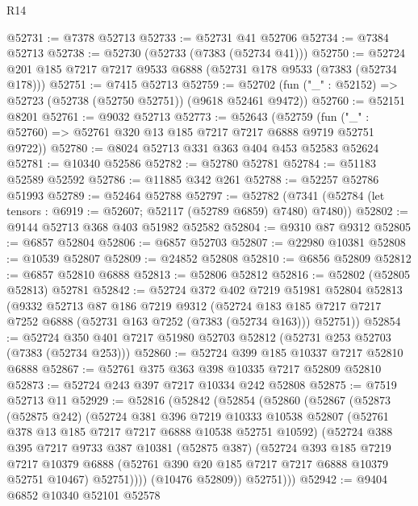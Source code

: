 \begin{lexlean}{R14}
\begin{coremodule}
@52731 := @7378 @52713
@52733 := @52731 @41 @52706
@52734 := @7384 @52713
@52738 := @52730 (@52733 (@7383 (@52734 @41)))
@52750 := @52724 @201 @185 @7217 @7217 @9533 @6888 (@52731 @178 @9533 (@7383 (@52734 @178)))
@52751 := @7415 @52713
@52759 := @52702 (fun ("_" : @52152) => @52723 (@52738 (@52750 @52751)) (@9618 @52461 @9472))
@52760 := @52151 @8201
@52761 := @9032 @52713
@52773 := @52643
    (@52759 (fun ("_" : @52760) => @52761 @320 @13 @185 @7217 @7217 @6888 @9719 @52751 @9722))
@52780 := @8024 @52713 @331 @363 @404 @453 @52583 @52624
@52781 := @10340 @52586
@52782 := @52780 @52781
@52784 := @51183 @52589 @52592
@52786 := @11885 @342 @261
@52788 := @52257 @52786 @51993
@52789 := @52464 @52788
@52797 := @52782 (@7341 (@52784 (let tensors : @6919 := @52607; @52117 (@52789 @6859) @7480) @7480))
@52802 := @9144 @52713 @368 @403 @51982 @52582
@52804 := @9310 @87 @9312
@52805 := @6857 @52804
@52806 := @6857 @52703
@52807 := @22980 @10381
@52808 := @10539 @52807
@52809 := @24852 @52808
@52810 := @6856 @52809
@52812 := @6857 @52810 @6888
@52813 := @52806 @52812
@52816 := @52802 (@52805 @52813) @52781
@52842 := @52724
    @372
    @402
    @7219
    @51981
    @52804
    @52813
    (@9332
      @52713
      @87
      @186
      @7219
      @9312
      (@52724 @183 @185 @7217 @7217 @7252 @6888 (@52731 @163 @7252 (@7383 (@52734 @163))) @52751))
@52854 := @52724 @350 @401 @7217 @51980 @52703 @52812 (@52731 @253 @52703 (@7383 (@52734 @253)))
@52860 := @52724 @399 @185 @10337 @7217 @52810 @6888
@52867 := @52761 @375 @363 @398 @10335 @7217 @52809 @52810
@52873 := @52724 @243 @397 @7217 @10334 @242 @52808
@52875 := @7519 @52713 @11
@52929 := @52816
    (@52842
      (@52854
        (@52860
          (@52867
            (@52873
              (@52875 @242)
              (@52724
                @381
                @396
                @7219
                @10333
                @10538
                @52807
                (@52761 @378 @13 @185 @7217 @7217 @6888 @10538 @52751 @10592)
                (@52724
                  @388
                  @395
                  @7217
                  @9733
                  @387
                  @10381
                  (@52875 @387)
                  (@52724
                    @393
                    @185
                    @7219
                    @7217
                    @10379
                    @6888
                    (@52761 @390 @20 @185 @7217 @7217 @6888 @10379 @52751 @10467)
                    @52751))))
            (@10476 @52809))
          @52751)))
@52942 := @9404
    @6852
    @10340
    @52101
    @52578

\end{coremodule}
\end{lexlean}
